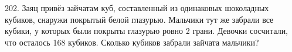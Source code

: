 202. Заяц привёз зайчатам куб, составленный из одинаковых шоколадных кубиков, снаружи покрытый белой глазурью. Мальчики тут же забрали все кубики, у которых были покрыты глазурью ровно 2 грани. Девочки сосчитали, что осталось 168 кубиков. Сколько кубиков забрали зайчата мальчики?\\
